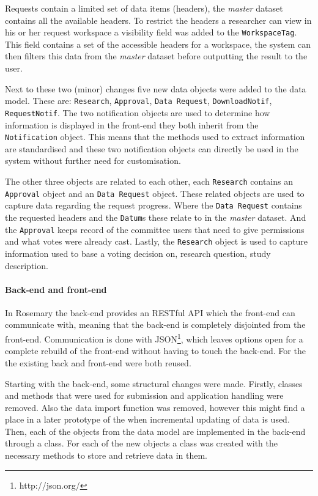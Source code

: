 Requests contain a limited set of data items (headers), the \emph{master} dataset contains all the available headers.
To restrict the headers a researcher can view in his or her request workspace a visibility field was added to the {\tt WorkspaceTag}.
This field contains a set of the accessible headers for a workspace, the system can then filters this data from the \emph{master} dataset before outputting the result to the user.

Next to these two (minor) changes five new data objects were added to the data model.
These are: {\tt Research}, {\tt Approval}, {\tt Data Request}, {\tt DownloadNotif}, {\tt RequestNotif}.
The two notification objects are used to determine how information is displayed in the front-end they both inherit from the {\tt Notification} object.
This means that the methods used to extract information are standardised and these two notification objects can directly be used in the system without further need for customisation.

The other three objects are related to each other, each {\tt Research} contains an {\tt Approval} object and an {\tt Data Request} object.
These related objects are used to capture data regarding the request progress.
Where the {\tt Data Request} contains the requested headers and the {\tt Datum}s these relate to in the \emph{master} dataset.
And the {\tt Approval} keeps record of the committee users that need to give permissions and what votes were already cast.
Lastly, the {\tt Research} object is used to capture information used to base a voting decision on, \eg{} research question, study description.

\paragraph{Back-end and front-end}
In Rosemary the back-end provides an RESTful API which the front-end can communicate with, meaning that the back-end is completely disjointed from the front-end.
Communication is done with JSON\footnote{http://json.org/}, which leaves options open for a complete rebuild of the front-end without having to touch the back-end.
For the \ivfsystem{} the existing back and front-end were both reused.

Starting with the back-end, some structural changes were made.
Firstly, classes and methods that were used for submission and application handling were removed.
Also the data import function was removed, however this might find a place in a later prototype of the \ivfsystem{} when incremental updating of data is used.
Then, each of the objects from the data model are implemented in the back-end through a class.
For each of the new objects a class was created with the necessary methods to store and retrieve data in them.

